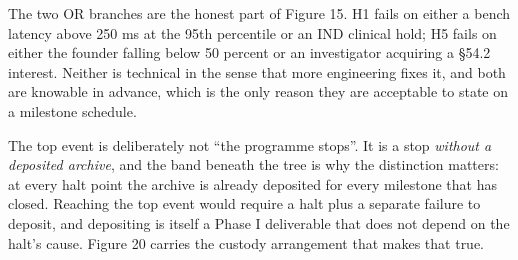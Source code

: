The two OR branches are the honest part of Figure 15. H1 fails on either a
bench latency above 250 ms at the 95th percentile or an IND clinical hold; H5
fails on either the founder falling below 50 percent or an investigator
acquiring a \S54.2 interest. Neither is technical in the sense that more
engineering fixes it, and both are knowable in advance, which is the only reason
they are acceptable to state on a milestone schedule.

The top event is deliberately not ``the programme stops''. It is a stop
\emph{without a deposited archive}, and the band beneath the tree is why the
distinction matters: at every halt point the archive is already deposited for
every milestone that has closed. Reaching the top event would require a halt
plus a separate failure to deposit, and depositing is itself a Phase I
deliverable that does not depend on the halt's cause. Figure 20 carries the
custody arrangement that makes that true.
